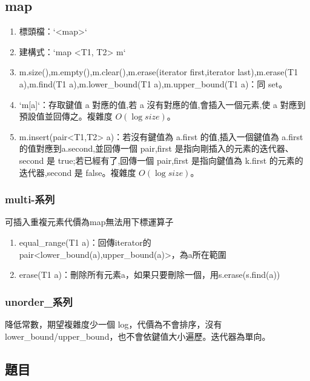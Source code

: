 \subsection{map}
\begin{enumerate}
\item 標頭檔：`<map>`
\item 建構式：`map <T1, T2> m`
\item m.size(),m.empty(),m.clear(),m.erase(iterator first,iterator last),m.erase(T1 a),m.find(T1 a),m.lower\_bound(T1 a),m.upper\_bound(T1 a)：同 set。
\item `m[a]`：存取鍵值 a 對應的值,若 a 沒有對應的值,會插入一個元素,使 a 對應到預設值並回傳之。複雜度 $O(\log size)$。
\item m.insert(pair<T1,T2> a)：若沒有鍵值為 a.first 的值,插入一個鍵值為 a.first 的值對應到a.second,並回傳一個 pair,first 是指向剛插入的元素的迭代器、second 是 true;若已經有了,回傳一個 pair,first 是指向鍵值為 k.first 的元素的迭代器,second 是 false。複雜度 $O(\log size)$。

\end{enumerate}
\subsubsection{multi-系列}
可插入重複元素代價為map無法用下標運算子
\begin{enumerate}
\item equal\_range(T1 a)：回傳iterator的pair<lower\_bound(a),upper\_bound(a)>，為a所在範圍
\item erase(T1 a)：刪除所有元素a，如果只要刪除一個，用s.erase(s.find(a))
\end{enumerate}
\subsubsection{unorder\_系列}
降低常數，期望複雜度少一個 log，代價為不會排序，沒有lower\_bound/upper\_bound，也不會依鍵值大小遍歷。迭代器為單向。
\subsection{題目}

